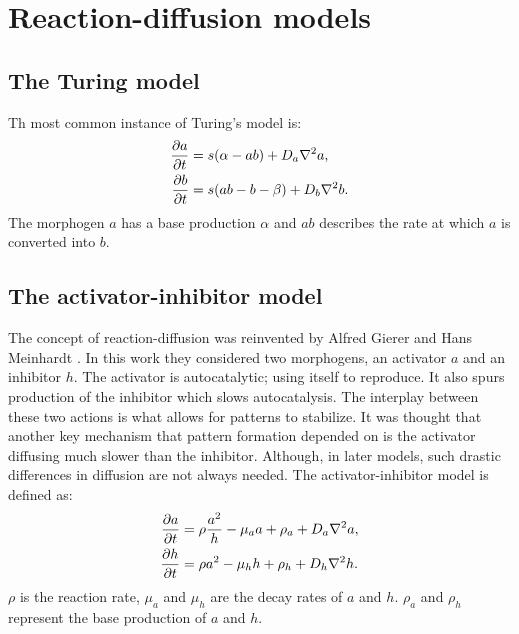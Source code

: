 \section{Reaction-diffusion models}
\subsection{The Turing model}
Th most common instance of Turing's model is:
\begin{equation}
\begin{aligned} \label{eq:turingRD}
		\frac{\partial a}{\partial t} &= s(\alpha-ab) + D_a \nabla^2 a,\\
		\frac{\partial b}{\partial t} &= s(ab-b-\beta) + D_b \nabla^2 b.
\end{aligned}
\end{equation}
The morphogen $a$ has a base production $\alpha$ and $ab$ describes the rate at which $a$ is converted into $b$. 

\subsection{The activator-inhibitor model}
The concept of reaction-diffusion was reinvented by Alfred Gierer and Hans Meinhardt \cite{Gierer1972}. In this work they considered two morphogens, an activator $a$ and an inhibitor $h$. The activator is autocatalytic; using itself to reproduce. It also spurs production of the inhibitor which slows autocatalysis. The interplay between these two actions is what allows for patterns to stabilize. It was thought that another key mechanism that pattern formation depended on is the activator diffusing much slower than the inhibitor. Although, in later models, such drastic differences in diffusion are not always needed. The activator-inhibitor model is defined as:
\begin{equation}
\begin{aligned} \label{eq:activatorInhibitorRD}
		\frac{\partial a}{\partial t} &= \rho \frac{a^2}{h} - \mu_a a + \rho_a + D_a \nabla^2 a,\\
		\frac{\partial h}{\partial t} &= \rho a^2 - \mu_h h  + \rho_h + D_h \nabla^2 h.
\end{aligned}
\end{equation}
$\rho$ is the reaction rate, $\mu_a$ and $\mu_h$ are the decay rates of $a$ and $h$. $\rho_a$ and $\rho_h$ represent the base production of $a$ and $h$. 

